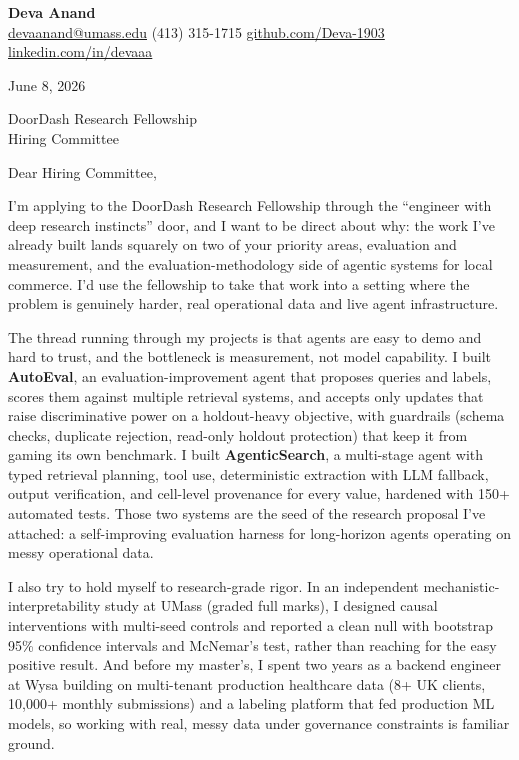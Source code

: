 \documentclass[letterpaper,11pt]{article}
\begin{document}
\begin{center}
  {\LARGE \bfseries \textcolor{ResumeNavy}{Deva Anand}} \\[3pt]
  {\small
  \href{mailto:devaanand@umass.edu}{devaanand@umass.edu} \enspace\textbar\enspace
  (413) 315-1715 \enspace\textbar\enspace
  \href{https://github.com/Deva-1903}{github.com/Deva-1903} \enspace\textbar\enspace
  \href{https://linkedin.com/in/devaaa/}{linkedin.com/in/devaaa}}
\end{center}
\vspace{6pt}

June 8, 2026

\vspace{2pt}
DoorDash Research Fellowship \\
Hiring Committee

\vspace{6pt}
Dear Hiring Committee,

I'm applying to the DoorDash Research Fellowship through the ``engineer with deep research instincts'' door, and I want to be direct about why: the work I've already built lands squarely on two of your priority areas, evaluation and measurement, and the evaluation-methodology side of agentic systems for local commerce. I'd use the fellowship to take that work into a setting where the problem is genuinely harder, real operational data and live agent infrastructure.

The thread running through my projects is that agents are easy to demo and hard to trust, and the bottleneck is measurement, not model capability. I built \textbf{AutoEval}, an evaluation-improvement agent that proposes queries and labels, scores them against multiple retrieval systems, and accepts only updates that raise discriminative power on a holdout-heavy objective, with guardrails (schema checks, duplicate rejection, read-only holdout protection) that keep it from gaming its own benchmark. I built \textbf{AgenticSearch}, a multi-stage agent with typed retrieval planning, tool use, deterministic extraction with LLM fallback, output verification, and cell-level provenance for every value, hardened with 150+ automated tests. Those two systems are the seed of the research proposal I've attached: a self-improving evaluation harness for long-horizon agents operating on messy operational data.

I also try to hold myself to research-grade rigor. In an independent mechanistic-interpretability study at UMass (graded full marks), I designed causal interventions with multi-seed controls and reported a clean null with bootstrap 95\% confidence intervals and McNemar's test, rather than reaching for the easy positive result. And before my master's, I spent two years as a backend engineer at Wysa building on multi-tenant production healthcare data (8+ UK clients, 10,000+ monthly submissions) and a labeling platform that fed production ML models, so working with real, messy data under governance constraints is familiar ground.
\end{document}
